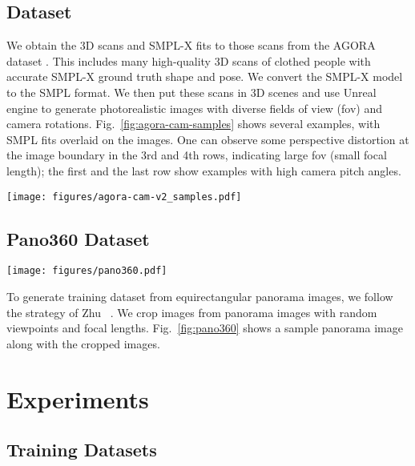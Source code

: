 \documentclass[10pt,twocolumn,letterpaper,usenames,dvipsnames]{article}
\begin{document}
\subsection{\agoracam Dataset}
We obtain the 3D scans and SMPL-X fits to those scans from the AGORA dataset \cite{patel2021agora}. 
This includes many high-quality 3D scans of clothed people with accurate SMPL-X ground truth shape and pose. 
We convert the SMPL-X model to the SMPL format.
We then put these scans in 3D scenes and use Unreal engine \cite{unrealengine} to generate photorealistic images with diverse fields of view (fov) and camera rotations.
Fig.~\ref{fig:agora-cam-samples} shows several examples, with SMPL fits overlaid on the images.
One can observe some perspective distortion at the image boundary in the 3rd and 4th rows, indicating large fov (small focal length); the first and the last row show examples with high camera pitch angles.

\begin{figure*}
    \centering
    \texttt{[image: figures/agora-cam-v2\_samples.pdf]}
    \caption{\textbf{\agoracam dataset samples.}}
    \label{fig:agora-cam-samples}
\end{figure*}

\subsection{Pano360 Dataset}

\begin{figure*}
    \centering
    \texttt{[image: figures/pano360.pdf]}
    \caption{\textbf{Pano360 dataset.} Random viewpoints (b) from a single equirectangular panorama image (a). Horizon annotations are shown in red line.}
    \label{fig:pano360}
\end{figure*}

To generate training dataset from equirectangular panorama images, we follow the strategy of Zhu \etal~\cite{zhu2020single}. We crop images from panorama images with random viewpoints and focal lengths. Fig.~\ref{fig:pano360} shows a sample panorama image along with the cropped images. 

\section{Experiments}


\subsection{Training Datasets}
\end{document}
